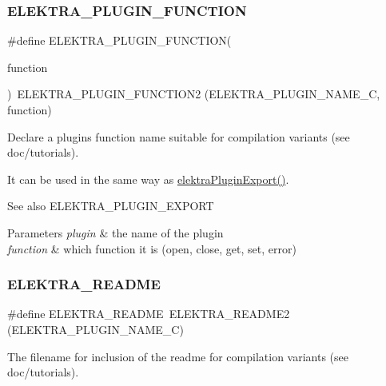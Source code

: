\subsubsection{\texorpdfstring{E\+L\+E\+K\+T\+R\+A\+\_\+\+P\+L\+U\+G\+I\+N\+\_\+\+F\+U\+N\+C\+T\+I\+ON}{ELEKTRA\_PLUGIN\_FUNCTION}}
{\footnotesize\ttfamily \#define E\+L\+E\+K\+T\+R\+A\+\_\+\+P\+L\+U\+G\+I\+N\+\_\+\+F\+U\+N\+C\+T\+I\+ON(\begin{DoxyParamCaption}\item[{}]{function }\end{DoxyParamCaption})~E\+L\+E\+K\+T\+R\+A\+\_\+\+P\+L\+U\+G\+I\+N\+\_\+\+F\+U\+N\+C\+T\+I\+O\+N2 (E\+L\+E\+K\+T\+R\+A\+\_\+\+P\+L\+U\+G\+I\+N\+\_\+\+N\+A\+M\+E\+\_\+C, function)}



Declare a plugin\textquotesingle{}s function name suitable for compilation variants (see doc/tutorials). 

It can be used in the same way as \hyperlink{group__plugin_ga8dd092048e972a3f0c9c9f54eb41576e}{elektra\+Plugin\+Export()}. \begin{DoxySeeAlso}{See also}
E\+L\+E\+K\+T\+R\+A\+\_\+\+P\+L\+U\+G\+I\+N\+\_\+\+E\+X\+P\+O\+RT
\end{DoxySeeAlso}

\begin{DoxyParams}{Parameters}
{\em plugin} & the name of the plugin \\
\hline
{\em function} & which function it is (open, close, get, set, error) \\
\hline
\end{DoxyParams}
\mbox{\label{group__plugin_gabdcb97b05a83130c32bbde75db80fc50}} 
\subsubsection{\texorpdfstring{E\+L\+E\+K\+T\+R\+A\+\_\+\+R\+E\+A\+D\+ME}{ELEKTRA\_README}}
{\footnotesize\ttfamily \#define E\+L\+E\+K\+T\+R\+A\+\_\+\+R\+E\+A\+D\+ME~E\+L\+E\+K\+T\+R\+A\+\_\+\+R\+E\+A\+D\+M\+E2 (E\+L\+E\+K\+T\+R\+A\+\_\+\+P\+L\+U\+G\+I\+N\+\_\+\+N\+A\+M\+E\+\_\+C)}



The filename for inclusion of the readme for compilation variants (see doc/tutorials). 


